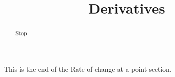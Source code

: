 \documentclass[handout]{ximera}
\title{Derivatives}
\begin{document}
\begin{abstract} Stop
\end{abstract}

\maketitle

This is the end of the Rate of change at a point section.
\end{document}
